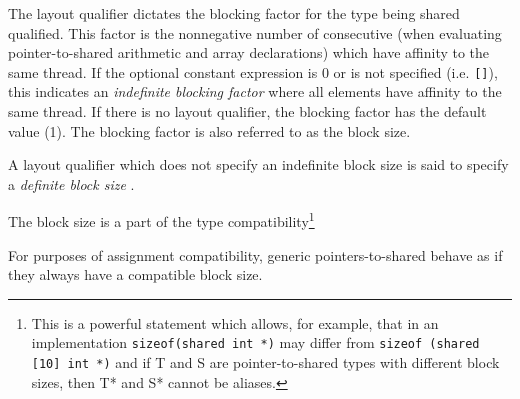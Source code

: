 \np The layout qualifier dictates the blocking factor for
    the type being shared qualified. This factor is the nonnegative
    number of consecutive  (when evaluating pointer-to-shared
    arithmetic and array declarations) which have affinity to the
    same thread. If the optional constant expression is 0 or is not
    specified (i.e. {\tt[]}), this indicates an {\em indefinite blocking factor}
    where all elements have affinity to the same thread.  If there
    is no layout qualifier, the blocking factor has the default value
    (1). The blocking factor is also referred to as the block size.

\np A layout qualifier which does not specify an indefinite
    block size is said to specify a {\em definite block size} .

\np The block size is a part of the type
    compatibility\footnote{This is a powerful statement which allows,
    for example, that in an implementation {\tt sizeof(shared int *)}
    may differ from {\tt sizeof (shared [10] int *)} and if T and S
    are pointer-to-shared types with different block sizes, then T* and S*
    cannot be aliases.}

\np For purposes of assignment compatibility, generic pointers-to-shared
    behave as if they always have a compatible block size.

\np {}
        
